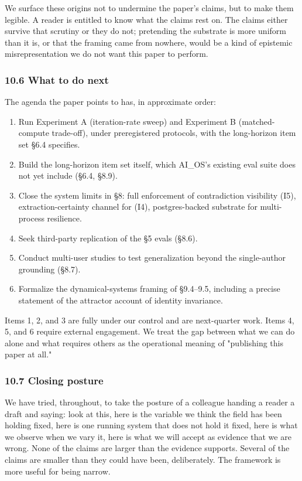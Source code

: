 \documentclass[11pt,letterpaper]{article}
\begin{document}
We surface these origins not to undermine the paper's claims, but to make them legible. A reader is entitled to know what the claims rest on. The claims either survive that scrutiny or they do not; pretending the substrate is more uniform than it is, or that the framing came from nowhere, would be a kind of epistemic misrepresentation we do not want this paper to perform.

\subsubsection*{10.6 What to do next}

The agenda the paper points to has, in approximate order:

\begin{enumerate}
  \item Run Experiment A (iteration-rate sweep) and Experiment B (matched-compute trade-off), under preregistered protocols, with the long-horizon item set §6.4 specifies.
  \item Build the long-horizon item set itself, which AI\_OS's existing eval suite does not yet include (§6.4, §8.9).
  \item Close the system limits in §8: full enforcement of contradiction visibility (I5), extraction-certainty channel for (I4), postgres-backed substrate for multi-process resilience.
  \item Seek third-party replication of the §5 evals (§8.6).
  \item Conduct multi-user studies to test generalization beyond the single-author grounding (§8.7).
  \item Formalize the dynamical-systems framing of §9.4–9.5, including a precise statement of the attractor account of identity invariance.
\end{enumerate}

Items 1, 2, and 3 are fully under our control and are next-quarter work. Items 4, 5, and 6 require external engagement. We treat the gap between what we can do alone and what requires others as the operational meaning of "publishing this paper at all."

\subsubsection*{10.7 Closing posture}

We have tried, throughout, to take the posture of a colleague handing a reader a draft and saying: look at this, here is the variable we think the field has been holding fixed, here is one running system that does not hold it fixed, here is what we observe when we vary it, here is what we will accept as evidence that we are wrong. None of the claims are larger than the evidence supports. Several of the claims are smaller than they could have been, deliberately. The framework is more useful for being narrow.
\end{document}
